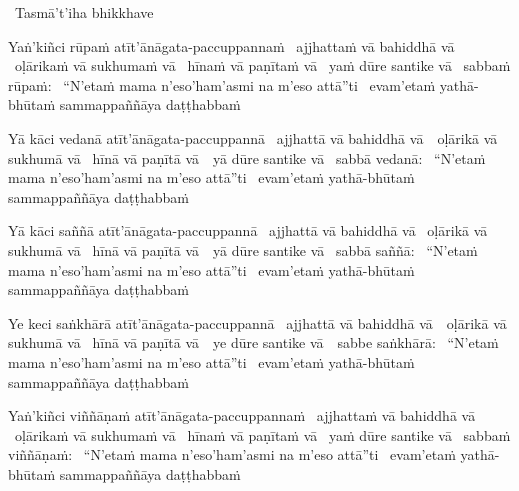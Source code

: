 \ifbfive\clearpage\fi
\ifafive\clearpage\fi
\ifninebythirteen\clearpage\fi

\begin{leader-pali}
  \anglebracketleft\ \hspace{-0.5mm}Tasmā't'iha bhikkhave \hspace{-0.5mm}\anglebracketright\
\end{leader-pali}

\ifninebythirteen\vspace{-0.35cm}\fi

\begin{pali-hang}
  Yaṅ'kiñci rūpaṁ atīt'ānāgata-paccuppannaṁ \breathmark\ ajjhattaṁ vā bahiddhā vā \breathmark\ oḷārikaṁ vā sukhumaṁ vā \breathmark\ hīnaṁ vā paṇītaṁ vā \breathmark\ yaṁ dūre santike vā \breathmark\ sabbaṁ rūpaṁ: \breathmark\ ``N'etaṁ mama n'eso'ham'asmi na m'eso attā''ti \breathmark\ evam'etaṁ yathā-bhūtaṁ sammappaññāya daṭṭhabbaṁ
\end{pali-hang}

\begin{pali-hang}
  Yā kāci vedanā atīt'ānāgata-paccuppannā \breathmark\ ajjhattā vā bahiddhā \mbox{vā}~\breathmark\ oḷārikā vā sukhumā vā \breathmark\ hīnā vā paṇītā \mbox{vā}~\breathmark\ yā dūre santike vā \breathmark\ sabbā vedanā: \breathmark\ ``N'etaṁ mama n'eso'ham'asmi na m'eso attā''ti \breathmark\ evam'etaṁ yathā-bhūtaṁ sammappaññāya daṭṭhabbaṁ
\end{pali-hang}

\begin{pali-hang}
  Yā kāci saññā atīt'ānāgata-paccuppannā \breathmark\ ajjhattā vā bahiddhā vā \breathmark\ oḷārikā vā sukhumā vā \breathmark\ hīnā vā paṇītā \mbox{vā}~\breathmark\ yā dūre santike vā \breathmark\ sabbā saññā: \breathmark\ ``N'etaṁ mama n'eso'ham'asmi na m'eso attā''ti \breathmark\ evam'etaṁ yathā-bhūtaṁ sammappaññāya daṭṭhabbaṁ
\end{pali-hang}

\begin{pali-hang}
  Ye keci saṅkhārā atīt'ānāgata-paccuppannā \breathmark\ ajjhattā vā bahiddhā \mbox{vā}~\breathmark\ oḷārikā vā sukhumā vā \breathmark\ hīnā vā paṇītā \mbox{vā}~\breathmark\ ye dūre santike \mbox{vā}~\breathmark\ sabbe saṅkhārā: \breathmark\ \ifninebythirteen\clearpage\fi ``N'etaṁ mama n'eso'ham'asmi na m'eso attā''ti \breathmark\ evam'etaṁ yathā-bhūtaṁ sammappaññāya daṭṭhabbaṁ
\end{pali-hang}

\begin{pali-hang}
  Yaṅ'kiñci viññāṇaṁ atīt'ānāgata-paccuppannaṁ \breathmark\ ajjhattaṁ vā bahiddhā vā \breathmark\ oḷārikaṁ vā sukhumaṁ vā \breathmark\ hīnaṁ vā paṇītaṁ vā \breathmark\ yaṁ dūre santike vā \breathmark\ sabbaṁ viññāṇaṁ: \breathmark\ ``N'etaṁ mama n'eso'ham'asmi na m'eso attā''ti \breathmark\ evam'etaṁ yathā-bhūtaṁ sammappaññāya daṭṭhabbaṁ
\end{pali-hang}

